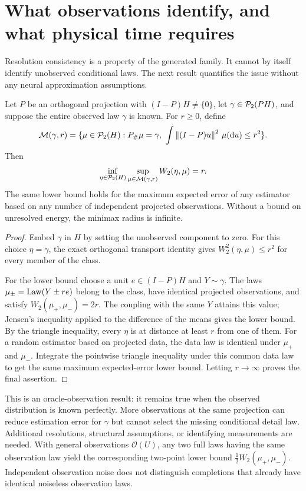 \section{What observations identify, and what physical time requires}\label{sec:information}
Resolution consistency is a property of the generated family. It cannot by itself identify unobserved conditional laws. The next result quantifies the issue without any neural approximation assumptions.

\begin{theorem}\label{thm:minimax}
Let $P$ be an orthogonal projection with $(I-P)H\ne\{0\}$, let $\gamma\in\mathcal P_2(PH)$, and suppose the entire observed law $\gamma$ is known. For $r\ge0$, define
\begin{equation}
 \mathcal M(\gamma,r)=\{\mu\in\mathcal P_2(H):P_{\#}\mu=\gamma,
              \ \int\left\lVert(I-P)u\right\rVert^2\,\mu(\mathrm du)\le r^2\}.
\end{equation}
Then
\begin{equation}\label{eq:minimax-radius}
 \inf_{\eta\in\mathcal P_2(H)}\sup_{\mu\in\mathcal M(\gamma,r)}W_2(\eta,\mu)=r.
\end{equation}
The same lower bound holds for the maximum expected error of any estimator based on any number of independent projected observations. Without a bound on unresolved energy, the minimax radius is infinite.
\end{theorem}
\begin{proof}
Embed $\gamma$ in $H$ by setting the unobserved component to zero. For this choice $\eta=\gamma$, the exact orthogonal transport identity gives $W_2^2(\eta,\mu)\le r^2$ for every member of the class.

For the lower bound choose a unit $e\in(I-P)H$ and $Y\sim\gamma$. The laws $\mu_\pm=\operatorname{Law}(Y\pm re)$ belong to the class, have identical projected observations, and satisfy $W_2(\mu_+,\mu_-)=2r$. The coupling with the same $Y$ attains this value; Jensen's inequality applied to the difference of the means gives the lower bound. By the triangle inequality, every $\eta$ is at distance at least $r$ from one of them. For a random estimator based on projected data, the data law is identical under $\mu_+$ and $\mu_-$. Integrate the pointwise triangle inequality under this common data law to get the same maximum expected-error lower bound. Letting $r\to\infty$ proves the final assertion.
\end{proof}

This is an oracle-observation result: it remains true when the observed distribution is known perfectly. More observations at the same projection can reduce estimation error for $\gamma$ but cannot select the missing conditional detail law. Additional resolutions, structural assumptions, or identifying measurements are needed. With general observations $\mathcal O(U)$, any two full laws having the same observation law yield the corresponding two-point lower bound $\frac12W_2(\mu_+,\mu_-)$. Independent observation noise does not distinguish completions that already have identical noiseless observation laws.

